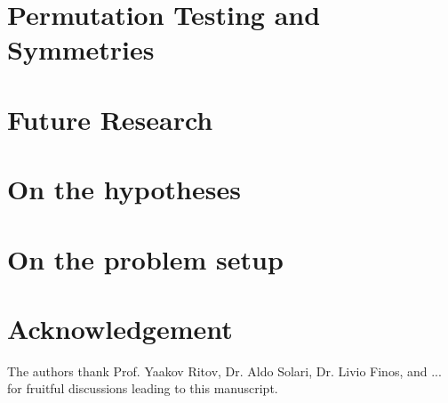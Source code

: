 \documentclass[article,lineno]{biometrika}
\begin{document}
\section{Permutation Testing and Symmetries}



\section{Future Research}


\section{On the hypotheses}

\section{On the problem setup}



\section*{Acknowledgement}
The authors thank Prof. Yaakov Ritov, Dr. Aldo Solari, Dr. Livio Finos, and ... for fruitful discussions leading to this manuscript. 






\end{document}
